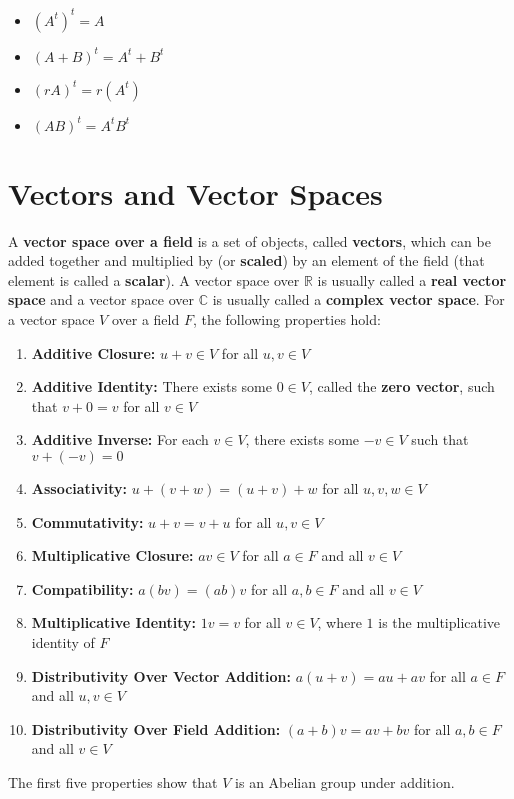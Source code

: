 \documentclass[12pt]{article}
\newcommand{\R}{\mathbb{R}}
\renewcommand{\C}{\mathbb{C}}
\begin{document}
\begin{itemize}
\item $(A^{t})^{t}=A$
\item $(A +B)^{t}=A^{t} + B^{t}$
\item $(rA)^{t}=r(A^{t})$
\item $(AB)^{t}=A^{t}B^{t}$
\end{itemize}

\section{Vectors and Vector Spaces}

A \textbf{vector space over a field} is a set of objects, called \textbf{vectors}, which can be added together and multiplied by (or \textbf{scaled}) by an element of the field (that element is called a \textbf{scalar}). A vector space over $\R$ is usually called a \textbf{real vector space} and a vector space over $\C$ is usually called a \textbf{complex vector space}. For a vector space $V$ over a field $F$, the following properties hold: \begin{enumerate}
\item \textbf{Additive Closure:} $u + v \in V$ for all $u,v \in V$

\item \textbf{Additive Identity:} There exists some $0 \in V$, called the \textbf{zero vector}, such that $v + 0 = v$ for all $v \in V$

\item \textbf{Additive Inverse:} For each $v \in V$, there exists some $-v \in V$ such that $v + (-v) = 0$

\item \textbf{Associativity:} $u + (v + w) = (u + v) + w$ for all $u,v,w \in V$

\item \textbf{Commutativity:} $u + v = v + u$ for all $u,v \in V$

\item \textbf{Multiplicative Closure:} $av \in V$ for all $a \in F$ and all $v \in V$

\item \textbf{Compatibility:} $a(bv) = (ab)v$ for all $a,b \in F$ and all $v \in V$

\item \textbf{Multiplicative Identity:} $1v = v$ for all $v \in V$, where $1$ is the multiplicative identity of $F$

\item \textbf{Distributivity Over Vector Addition:} $a(u + v) = au + av$ for all $a \in F$ and all $u,v \in V$

\item \textbf{Distributivity Over Field Addition:} $(a + b)v = av + bv$ for all $a, b \in F$ and all $v \in V$
\end{enumerate} The first five properties show that $V$ is an Abelian group under addition.
\end{document}
